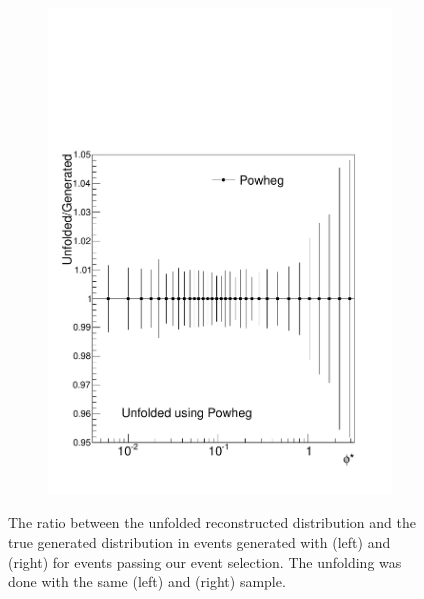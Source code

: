 \begin{figure}[!htbp]
\begin{subfigure}[b]{\SideBySidePlotWidth}
        \caption{}
        \label{fig:unfolding_madgraph_with_madgraph}
    \end{subfigure}%
    \begin{subfigure}[b]{\SideBySidePlotWidth}
        \includegraphics[width=\textwidth]{figures/BinM_PP.pdf}
        \caption{}
        \label{fig:unfolding_powheg_with_powheg}
    \end{subfigure}
    \caption{
        The ratio between the unfolded reconstructed \phistar distribution
        and the true generated \phistar distribution in \Ztoee
        events generated with \MADGRAPH (left) and \POWHEG (right) for events
        passing our event selection. The unfolding was done with the same
        \MADGRAPH (left) and \POWHEG (right) sample.
    }
    \label{fig:unfolded_vs_true_in_mc}
\end{figure}

